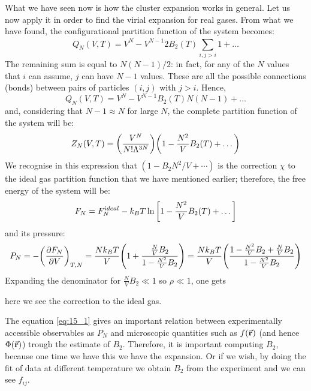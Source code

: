 \documentclass[../../Main/Main.tex]{subfiles}
\begin{document}
What we have seen now is how the cluster expansion works in general. Let us now apply it in order to find the virial expansion for real gases. From what we have found, the configurational partition function of the system becomes:
\begin{equation*}
  Q_N (V,T) = V^N -  V^{N-1} 2 B_2 (T)  \sum_{i,j>i}^{} 1 + \dots
\end{equation*}
The remaining sum is equal to \( N(N-1)/2 \): in fact, for any of the \( N \) values that
\( i \) can assume,  \( j \)  can have \( N-1 \) values. These are all the possible connections (bonds) between pairs of particles \( (i,j) \) with \( j>i \).
Hence,
\begin{equation}
  Q_N (V,T) = V^N - V^{N-1}  B_2 (T)  N (N-1) + \dots
\end{equation}
and, considering that  \( N-1 \approx N \) for large \( N \), the complete partition function of the system will be:
\begin{equation}
  Z_N (V,T) = \qty(\frac{V^N}{N! \Lambda ^{3N}}) \qty(1- \frac{N^2}{V} B_2 (T)+ \dots)
\end{equation}
We recognise in this expression that \( (1-B_{2}N^{2}/V+\cdots ) \) is the correction \( \chi  \) to the ideal gas partition function that we have mentioned earlier; therefore, the free energy of the system will be:
\begin{equation}
  F_N = F_N^{ideal} - k_B T \ln{\qty[1-\frac{N^2}{V}B_2 (T)+ \dots] }
\end{equation}
and its pressure:
\begin{equation*}
  P_N = - \qty(\pdv{F_N}{V} )_{T,N} = \frac{N k_B T}{V} \qty(1+ \frac{\frac{N}{V}B_2}{1- \frac{N^2}{V}B_2})
  = \frac{N k_B T}{V} \qty(\frac{1 -\frac{N^2}{V} B_2 + \frac{N}{V} B_2 }{1- \frac{N^2}{V} B_2})
\end{equation*}
Expanding the denominator for \( \frac{N}{V} B_2 \ll 1 \) so \( \rho \ll 1 \), one gets
here we see the correction to the ideal gas.
\begin{remark}
The equation \eqref{eq:15_1} gives an important relation between experimentally accessible observables as \( P_N \) and microscopic quantities such as \( f(\va{r}) \) (and hence \( \Phi (\va{r}) \)) trough the estimate of \( B_2 \).
Therefore, it is important computing \( B_2 \), because one time we have this we have the expansion. Or if we wish, by doing the fit of data at different temperature we obtain \( B_2 \) from the experiment and we can see \( f_{ij} \).
\end{remark}
\end{document}
